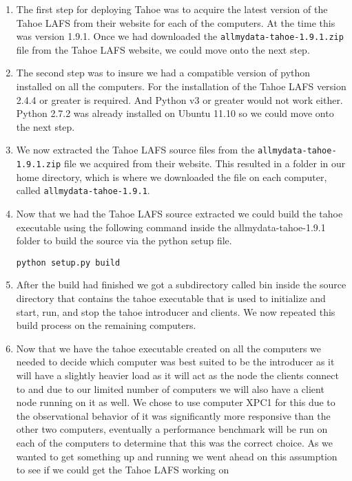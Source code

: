\documentclass[11pt]{article}
\begin{document}
\begin{enumerate}
\item The first step for deploying Tahoe was to acquire the latest
  version of the Tahoe LAFS from their website for each of the
  computers. \cite{tahoe-lafs.org} At the time this was version
  1.9.1. Once we had downloaded the \texttt{allmydata-tahoe-1.9.1.zip} file
  from the Tahoe LAFS website, we could move onto the next step.
\item The second step was to insure we had a compatible version of
  python installed on all the computers. \cite{python.org} For the
  installation of the Tahoe LAFS version 2.4.4 or greater is
  required. And Python v3 or greater would not work either. Python
  2.7.2 was already installed on Ubuntu 11.10 so we could move onto
  the next step.
\item We now extracted the Tahoe LAFS source files from the
  \texttt{allmydata-tahoe-1.9.1.zip} file we acquired from their website. This
  resulted in a folder in our home directory, which is where we
  downloaded the file on each computer, called \texttt{allmydata-tahoe-1.9.1}.
\item Now that we had the Tahoe LAFS source extracted we could build
  the tahoe executable using the following command inside the
  allmydata-tahoe-1.9.1 folder to build the source via the python
  setup file.
\begin{verbatim}
python setup.py build
\end{verbatim}
\item After the build had finished we got a subdirectory called bin
  inside the source directory that contains the tahoe executable that
  is used to initialize and start, run, and stop the tahoe introducer
  and clients. We now repeated this build process on the remaining
  computers.
\item Now that we have the tahoe executable created on all the
  computers we needed to decide which computer was best suited to be
  the introducer as it will have a slightly heavier load as it will
  act as the node the clients connect to and due to our limited number
  of computers we will also have a client node running on it as
  well. We chose to use computer XPC1 for this due to the
  observational behavior of it was significantly more responsive than
  the other two computers, eventually a performance benchmark will be
  run on each of the computers to determine that this was the correct
  choice. As we wanted to get something up and running we went ahead
  on this assumption to see if we could get the Tahoe LAFS working on

\end{enumerate}
\end{document}
